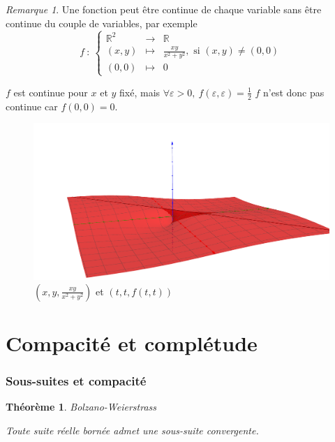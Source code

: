 \documentclass[]{article}
\newtheorem{mythm}{Théorème}
\theoremstyle{remark}
\newtheorem{myrem}{Remarque}
\theoremstyle{definition}
\begin{document}
\begin{myrem}
	Une fonction peut être continue de chaque variable sans être continue du couple de variables, par exemple
	$$f ~ : ~ \left\{
	\begin{array}{ccl}
		\mathbb{R}^2 & \longrightarrow & \mathbb{R} \\
		(x, y) & \longmapsto & \frac{xy}{x^2+y^2}, \text{ si } (x, y) \neq (0, 0) \\
		(0, 0) & \longmapsto & 0
	\end{array}
	\right.$$
	
	$f$ est continue pour $x$ et $y$ fixé, mais $\forall \varepsilon > 0, ~ f(\varepsilon, \varepsilon) = \frac{1}{2}$
	$f$ n'est donc pas continue car $f(0, 0)=0$.
	
		\begin{figure}[h!]
			\centering
			\includegraphics[width=550pt]{Continue_sur_chaque_variable}
			\caption{$\left(x, y, \frac{xy}{x^2+y^2}\right)$ et $(t, t, f(t, t))$}
		\end{figure}
\end{myrem}

\part{Compacité et complétude}

\section{Sous-suites et compacité}
	
\begin{mythm}{Bolzano-Weierstrass}

	Toute suite réelle bornée admet une sous-suite convergente.
\end{mythm}
\end{document}
